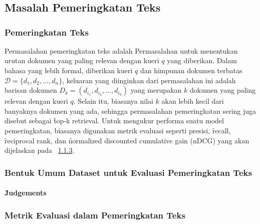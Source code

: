 \chapter{\babDua}
\label{bab:2}

\noindent{}



\section{Masalah Pemeringkatan Teks}
    \subsection{Pemeringkatan Teks}

    Permasalahan pemeringkatan teks adalah Permasalahan untuk menentukan urutan dokumen yang paling relevan dengan kueri $q$ yang diberikan. Dalam bahasa yang lebih formal, diberikan kueri $q$ dan himpunan dokumen terbatas $\mathcal{D}= \{d_1, d_2, ..., d_n\}$, keluaran yang diinginkan dari permasalahan ini adalah barisan dokumen $D_k = (d_{i_1}, d_{i_2}, ..., d_{i_k})$ yang merupakan $k$ dokumen yang paling relevan dengan kueri $q$. Selain itu, biasanya nilai $k$ akan lebih kecil dari banyaknya dokumen yang ada, sehingga permasalahan pemeringkatan sering juga disebut sebagai \f{top-k retrieval}. Untuk mengukur performa suatu model pemeringkatan, biasanya digunakan metrik evaluasi seperti presisi, \f{recall}, \f{reciprocal rank}, dan \f{normalized discounted cumulative gain} (nDCG) yang akan dijelaskan pada \sect~\ref{sec:metrik-evaluasi}.

    \subsection{Bentuk Umum Dataset untuk Evaluasi Pemeringkatan Teks}
    \label{sec:dataset-umum}
    


        \subsubsection{\f{Judgements}}
    

    \subsection{Metrik Evaluasi dalam Pemeringkatan Teks}
    \label{sec:metrik-evaluasi}


